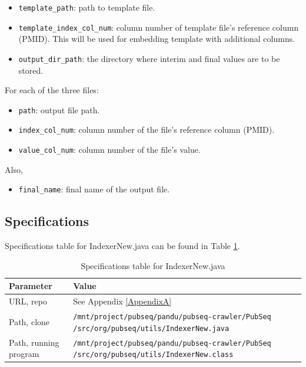 \begin{itemize}
\item \texttt{template\_path}: path to template file.
\item \texttt{template\_index\_col\_num}: column number of template file's reference column (PMID). This will be used for embedding template with additional columns.
\item \texttt{output\_dir\_path}: the directory where interim and final values are to be stored.
\end{itemize}

For each of the three files:

\begin{itemize}
\item \texttt{path}: output file path.
\item \texttt{index\_col\_num}: column number of the file's reference column (PMID).
\item \texttt{value\_col\_num}: column number of the file's value.
\end{itemize}

Also,

\begin{itemize}
\item \texttt{final\_name}: final name of the output file.
\end{itemize}

\subsection{Specifications}

Specifications table for IndexerNew.java can be found in Table \ref{tab:IndexerNew}.

\begin{table}[htbp]
\caption{Specifications table for IndexerNew.java}
\centering
\begin{tabularx}{\textwidth}{ | l | X | }
  \hline
  Parameter & Value \\
  \hline
  URL, repo & See Appendix \ref{AppendixA} \\
  Path, clone & \texttt{/mnt/project/pubseq/pandu/pubseq-crawler/PubSeq /src/org/pubseq/utils/IndexerNew.java} \\
  Path, running program & \texttt{/mnt/project/pubseq/pandu/pubseq-crawler/PubSeq /src/org/pubseq/utils/IndexerNew.class}\\
  \hline
\end{tabularx}
\label{tab:IndexerNew}
\end{table}

